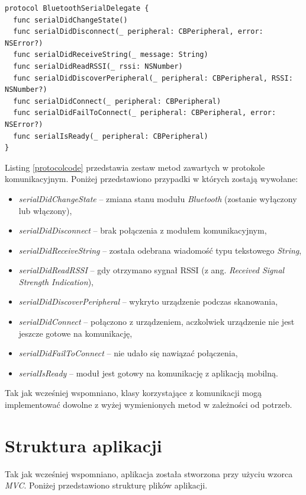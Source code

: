 \begin{minipage}{\textwidth}
	\begin{lstlisting}[label=protocolcode,caption=Protokół odpowiedzialny za komunikację między urządzeniami.]
protocol BluetoothSerialDelegate {
  func serialDidChangeState()
  func serialDidDisconnect(_ peripheral: CBPeripheral, error: NSError?)
  func serialDidReceiveString(_ message: String)
  func serialDidReadRSSI(_ rssi: NSNumber)
  func serialDidDiscoverPeripheral(_ peripheral: CBPeripheral, RSSI: NSNumber?)
  func serialDidConnect(_ peripheral: CBPeripheral)
  func serialDidFailToConnect(_ peripheral: CBPeripheral, error: NSError?)
  func serialIsReady(_ peripheral: CBPeripheral)
}
	\end{lstlisting}
\end{minipage}

Listing \ref{protocolcode} przedstawia zestaw metod zawartych w protokole komunikacyjnym. Poniżej przedstawiono przypadki w których zostają wywołane:

\begin{itemize}
\item \textit{serialDidChangeState} –  zmiana stanu modułu \textit{Bluetooth} (zostanie wyłączony lub włączony),
\item \textit{serialDidDisconnect} –  brak połączenia z modułem komunikacyjnym,
\item \textit{serialDidReceiveString} – została odebrana wiadomość typu tekstowego \textit{String},
\item \textit{serialDidReadRSSI} – gdy otrzymano sygnał RSSI (z ang. \textit{Received Signal Strength Indication}),
\item \textit{serialDidDiscoverPeripheral} – wykryto urządzenie podczas skanowania,
\item \textit{serialDidConnect} – połączono z urządzeniem, aczkolwiek urządzenie nie jest jeszcze gotowe na komunikację,
\item \textit{serialDidFailToConnect} – nie udało się nawiązać połączenia,
\item \textit{serialIsReady} – moduł jest gotowy na komunikację z aplikacją mobilną.
\end{itemize}

Tak jak wcześniej wspomniano, klasy korzystające z komunikacji mogą implementować dowolne z wyżej wymienionych metod w zależności od potrzeb.

\newpage

\section{Struktura aplikacji}
Tak jak wcześniej wspomniano, aplikacja została stworzona przy użyciu wzorca \textit{MVC}. Poniżej przedstawiono strukturę plików aplikacji.

